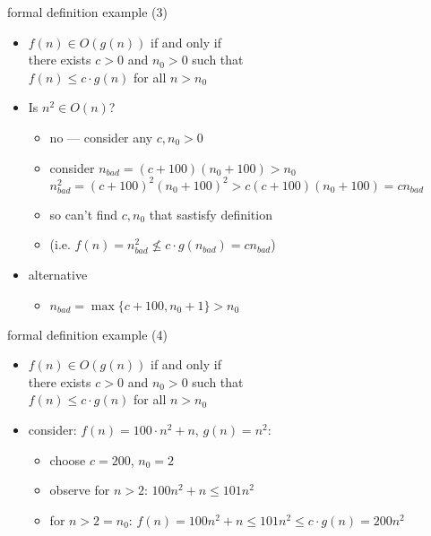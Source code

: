 \begin{frame}{formal definition example (3)}
    \begin{itemize}
    \item $f(n) \in O(g(n))$ if and only if \\
        \hspace{.5cm}there exists $c > 0$ and $n_0 > 0$ such that \\
        \hspace{.5cm}$f(n) \le c \cdot g(n)$ for all $n > n_0$
    \item Is $n^2 \in O(n)$?
        \begin{itemize}
        \item<2-> no --- consider any $c, n_0 > 0$
        \item<2-> consider $n_{bad} = (c + 100)(n_0 + 100) > n_0$ \\
            $n_{bad}^2 = (c + 100)^2(n_0 + 100)^2 > c(c + 100)(n_0 + 100) = cn_{bad}$ \\
        \item<2-> so can't find $c, n_0$ that sastisfy definition
        \item<2-> (i.e. $f(n) = n_{bad}^2 \not\le c \cdot g(n_{bad}) = c n_{bad}$)
        \end{itemize}
    \item<3-> alternative
        \begin{itemize}
        \item<3-> $n_{bad} = \max\{c + 100, n_0 + 1\} > n_0$
        \end{itemize}
    \end{itemize}
\end{frame}


\begin{frame}{formal definition example (4)}
    \begin{itemize}
    \item $f(n) \in O(g(n))$ if and only if \\
        \hspace{.5cm}there exists $c > 0$ and $n_0 > 0$ such that \\
        \hspace{.5cm}$f(n) \le c \cdot g(n)$ for all $n > n_0$
    \item consider: $f(n) = 100\cdot n^2 + n$, $g(n) = n^2$:
        \begin{itemize}
        \item choose $c = 200$, $n_0 = 2$
        \item observe for $n > 2$: $100n^2 + n \le 101n^2$
        \item for $n > 2=n_0$: $f(n) = 100n^2 + n \le 101n^2 \le c\cdot g(n) = 200n^2$
        \end{itemize}
    \end{itemize}
\end{frame}

